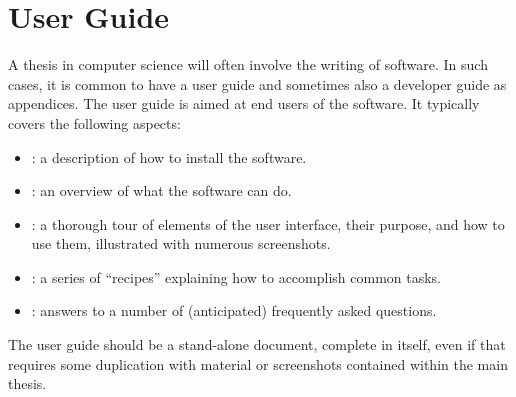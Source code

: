 %
%
% 
% 
% 

\chapter{User Guide}

\label{app:UserGuide}

A thesis in computer science will often involve the writing of
software. In such cases, it is common to have a user guide and
sometimes also a developer guide as appendices.
The user guide is aimed at end users of the software.
It typically covers the following aspects:
\begin{itemize}
\item {}: a description of how to install the
  software.

\item {}: an overview of what the software can do.

\item {}: a thorough tour of elements of the
  user interface, their purpose, and how to use them, illustrated with
  numerous screenshots.

\item {}: a series of ``recipes'' explaining how to
  accomplish common tasks.

\item {}: answers to a number of (anticipated) frequently
  asked questions.
\end{itemize}
The user guide should be a stand-alone document, complete in itself,
even if that requires some duplication with material or screenshots
contained within the main thesis.


